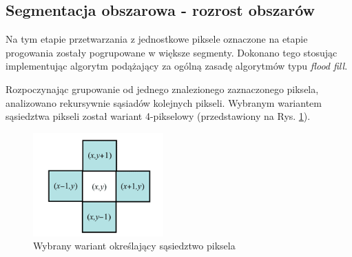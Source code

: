 \subsection{Segmentacja obszarowa - rozrost obszarów}

Na tym etapie przetwarzania z jednostkowe piksele oznaczone na etapie progowania zostały pogrupowane w większe segmenty. Dokonano tego stosując implementując algorytm podążający za ogólną zasadę algorytmów typu \emph{flood fill}.

Rozpoczynając grupowanie od jednego znalezionego zaznaczonego piksela, analizowano rekursywnie sąsiadów kolejnych pikseli. Wybranym wariantem sąsiedztwa pikseli został wariant 4-pikselowy (przedstawiony na Rys. \ref{fig:pixel_4_nb}).

\begin{figure}
    \centering
    \includegraphics[width=5cm]{figures/4_pixel_neighbourhood.png}
    \caption{Wybrany wariant określający sąsiedztwo piksela}
    \label{fig:pixel_4_nb}
\end{figure}
